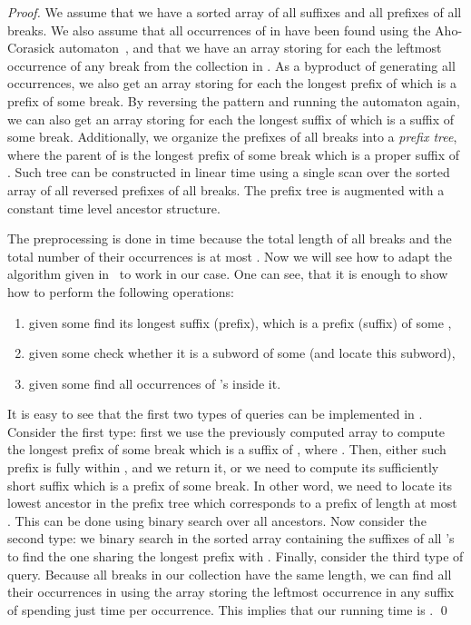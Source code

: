 \documentclass[runningheads]{llncs}
\begin{document}
\begin{proof}
We assume that we have a sorted array of all suffixes and all prefixes of all breaks. We also assume that all occurrences of  in  have been found using the Aho-Corasick automaton~\cite{AhoCorasick}, and that we have an array storing for each  the leftmost occurrence of any break from the collection in .
As a byproduct of generating all occurrences, we also get an array storing for each  the longest prefix of  which is a prefix of some break.
By reversing the pattern and running the automaton again, we can also get an array storing for each  the longest suffix of  which is a suffix of some break. Additionally, we organize the prefixes of all breaks into a {\it prefix tree}, where the parent of  is the longest prefix of some break which is a proper suffix of . Such tree can be constructed in linear time using a single scan over the sorted array of all reversed prefixes of all breaks. The prefix tree is augmented with a constant time level ancestor structure.

The preprocessing is done in  time because the total length of all breaks and the total number of their occurrences is at most .
Now we will see how to adapt the algorithm given in~\cite{GawrychowskiMultipleLZW} to work in our case. One can see, that it is enough to show how to perform the following operations:
\begin{enumerate}
\item given some  find its longest suffix (prefix), which is a prefix (suffix) of some ,
\item given some  check whether it is a subword of some  (and locate this subword),
\item given some  find all occurrences of 's inside it.
\end{enumerate}
It is easy to see that the first two types of queries can be implemented in . Consider the first type: first we use the previously computed array to compute the longest prefix of some break which is a suffix of , where . Then, either such prefix is
fully within , and we return it, or we need to compute its sufficiently short suffix which is a prefix of some break. In other word, we need
to locate its lowest ancestor in the prefix tree which corresponds to a prefix of length at most . This can be done using binary search over all ancestors. Now consider
the second type: we binary search in the sorted array containing the suffixes of all 's to find the one sharing the longest prefix with . Finally, consider the third type of query. Because all breaks in our collection have the same length, we can find all their occurrences in  using the array storing the leftmost occurrence in any
suffix of  spending just  time per occurrence. This implies that our running time is .
\qed
\end{proof}
\end{document}
